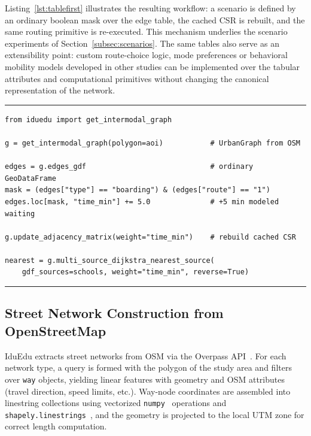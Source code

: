 \documentclass[smartcities,article,submit,moreauthors]{Definitions/mdpi}
\begin{document}
    Listing~\ref{lst:tablefirst} illustrates the resulting workflow: a scenario is defined by an
    ordinary boolean mask over the edge table, the cached CSR is rebuilt, and the same routing primitive
    is re-executed.
    This mechanism underlies the scenario experiments of Section~\ref{subsec:scenarios}.
    The same tables also serve as an extensibility point: custom route-choice logic, mode preferences or
    behavioral mobility models developed in other studies can be implemented over the tabular attributes
    and computational primitives without changing the canonical representation of the network.

    \begin{listing}[H]
        \caption{Table-first scenario workflow: a service-degradation scenario expressed as a GeoPandas mask
        over \texttt{edges\_gdf}, followed by CSR rebuild and re-routing.\label{lst:tablefirst}}
        \rule{\columnwidth}{1pt}
        \raggedright\small
        \begin{verbatim}
from iduedu import get_intermodal_graph

g = get_intermodal_graph(polygon=aoi)           # UrbanGraph from OSM

edges = g.edges_gdf                             # ordinary GeoDataFrame
mask = (edges["type"] == "boarding") & (edges["route"] == "1")
edges.loc[mask, "time_min"] += 5.0              # +5 min modeled waiting

g.update_adjacency_matrix(weight="time_min")    # rebuild cached CSR

nearest = g.multi_source_dijkstra_nearest_source(
    gdf_sources=schools, weight="time_min", reverse=True)
        \end{verbatim}
        \rule{\columnwidth}{1pt}
    \end{listing}

    \subsection{Street Network Construction from OpenStreetMap}
    \label{subsec:street-construction}

    IduEdu extracts street networks from OSM via the Overpass API~\cite{overpass_api}.
    For each network type, a query is formed with the polygon of the study area and filters over
    \texttt{way} objects, yielding linear features with geometry and OSM attributes (travel direction,
    speed limits, etc.).
    Way-node coordinates are assembled into linestring collections using vectorized
    \texttt{numpy}~\cite{harris2020numpy} operations and \texttt{shapely.linestrings}~\cite{shapely},
    and the geometry is projected to the local UTM zone for correct length computation.
\end{document}
